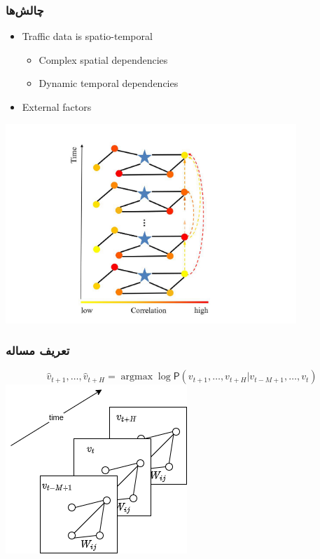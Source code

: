 \documentclass{beamer}
\begin{document}
\begin{persian}
\begin{frame}
  \frametitle{چالش‌ها}
  \begin{itemize}
    \item Traffic data is spatio-temporal
          \begin{itemize}
            \item Complex spatial dependencies
            \item Dynamic temporal dependencies
          \end{itemize}
    \item External factors
  \end{itemize}
  \centering
  \includegraphics[height=0.5\textheight]{./img/correlations.png}
\end{frame}

\begin{frame}
  \frametitle{تعریف مساله}
  \begin{equation}
    \label{eq:base}
    \hat{v}_{t+1}, \ldots,  \hat{v}_{t+H} = \mathop{\mathrm{argmax}} \log \mathsf{P}({v}_{t+1}, \ldots,  v_{t+H} | v_{t-M+1} , \ldots,  v_{t})
  \end{equation}
  \centering
  \includegraphics[height=.5\textheight]{img/base.png} %
\end{frame}


\end{persian}
\end{document}

